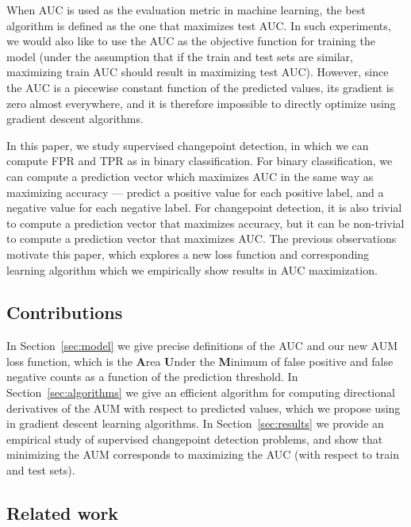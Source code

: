 \documentclass{article}
\begin{document}
When AUC is used as the evaluation metric in machine learning, the best algorithm is defined as the one that maximizes test AUC.
In such experiments, we would also like to use the AUC as the objective function for training the model (under the assumption that if the train and test sets are similar, maximizing train AUC should result in maximizing test AUC). 
However, since the AUC is a piecewise constant function of the predicted values, its gradient is zero almost everywhere, and it is therefore impossible to directly optimize using gradient descent algorithms.

In this paper, we study supervised changepoint detection, in which we can compute FPR and TPR as in binary classification.
For binary classification, we can compute a prediction vector which maximizes AUC in the same way as maximizing accuracy --- predict a positive value for each positive label, and a negative value for each negative label.
For changepoint detection, it is also trivial to compute a prediction vector that maximizes accuracy, but it can be non-trivial to compute a prediction vector that maximizes AUC.
The previous observations motivate this paper, which explores a new loss function and corresponding learning algorithm which we empirically show results in AUC maximization.

\subsection{Contributions}

In Section~\ref{sec:model} we give precise definitions of the AUC and our new AUM loss function, which is the \textbf{A}rea \textbf{U}nder the \textbf{M}inimum of false positive and false negative counts as a function of the prediction threshold.
In Section~\ref{sec:algorithms} we give an efficient algorithm for computing directional derivatives of the AUM with respect to predicted values, which we propose using in gradient descent learning algorithms.
In Section~\ref{sec:results} we provide an empirical study of supervised changepoint detection problems, and show that minimizing the AUM corresponds to maximizing the AUC (with respect to train and test sets).

\subsection{Related work}
\label{sec:related-work}
\end{document}
